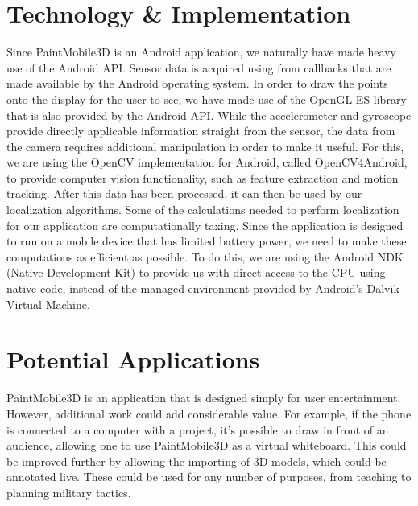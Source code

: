 \documentclass{chi-ext}
\begin{document}

\section{Technology \& Implementation}

Since PaintMobile3D is an Android application, we naturally have made heavy
use of the Android API. Sensor data is acquired using from callbacks that are
made available by the Android operating system. In order to draw the points
onto the display for the user to see, we have made use of the OpenGL ES
library that is also provided by the Android API. While the accelerometer and
gyroscope provide directly applicable information straight from the sensor,
the data from the camera requires additional manipulation in order to make it
useful. For this, we are using the OpenCV implementation for Android, called
OpenCV4Android, to provide computer vision functionality, such as feature
extraction and motion tracking. After this data has been processed, it can
then be used by our localization algorithms. Some of the calculations needed
to perform localization for our application are computationally taxing. Since
the application is designed to run on a mobile device that has limited battery
power, we need to make these computations as efficient as possible. To do
this, we are using the Android NDK (Native Development Kit) to provide us with
direct access to the CPU using native code, instead of the managed environment
provided by Android's Dalvik Virtual Machine.

\section{Potential Applications}

PaintMobile3D is an application that is designed simply for user entertainment. However, additional work could add
considerable value. For example, if the phone is connected to a computer with a project, it's possible to draw in front of an audience,
allowing one to use PaintMobile3D as a virtual whiteboard. This could be improved further by allowing the importing of
3D models, which could be annotated live. These could be used for any number of purposes, from teaching to planning military tactics.
\end{document}
